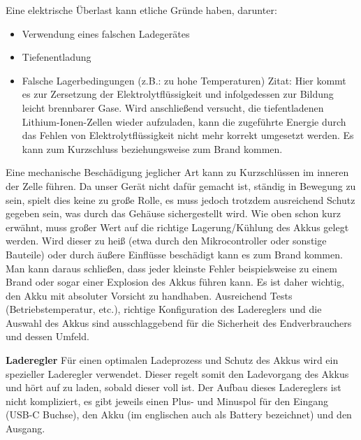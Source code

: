 \documentclass[11pt, twoside]{article}
\begin{document}
Eine elektrische Überlast kann etliche Gründe haben, darunter: 
\begin{itemize}
	\item Verwendung eines falschen Ladegerätes
	\item Tiefenentladung
	\item Falsche Lagerbedingungen (z.B.: zu hohe Temperaturen) 
\newline
Zitat: \glqq Hier kommt es zur Zersetzung der Elektrolytflüssigkeit und infolgedessen zur Bildung leicht brennbarer Gase. Wird anschließend versucht, die tiefentladenen Lithium-Ionen-Zellen wieder aufzuladen, kann die zugeführte Energie durch das Fehlen von Elektrolytflüssigkeit nicht mehr korrekt umgesetzt werden. Es kann zum Kurzschluss beziehungsweise zum Brand kommen.\grqq{} \parencite[][]{noauthor_urlnl11_nodate}
\end{itemize}
Eine mechanische Beschädigung jeglicher Art kann zu Kurzschlüssen im inneren der Zelle führen. Da unser Gerät nicht dafür gemacht ist, ständig in Bewegung zu sein, spielt dies keine zu große Rolle, es muss jedoch trotzdem ausreichend Schutz gegeben sein, was durch das Gehäuse sichergestellt wird.
\vspace{4mm}\newline
Wie oben schon kurz erwähnt, muss großer Wert auf die richtige Lagerung/Kühlung des Akkus gelegt werden. Wird dieser zu heiß (etwa durch den Mikrocontroller oder sonstige Bauteile) oder durch äußere Einflüsse beschädigt kann es zum Brand kommen.
\vspace{4mm}\newline
Man kann daraus schließen, dass jeder kleinste Fehler beispielsweise zu einem Brand oder sogar einer Explosion des Akkus führen kann. Es ist daher wichtig, den Akku mit absoluter Vorsicht zu handhaben. Ausreichend Tests (Betriebstemperatur, etc.), richtige Konfiguration des Ladereglers und die Auswahl des Akkus sind ausschlaggebend für die Sicherheit des Endverbrauchers und dessen Umfeld.

\parencite[vgl.][]{noauthor_urlnl11_nodate}

\textbf{Laderegler}\newline
Für einen optimalen Ladeprozess und Schutz des Akkus wird ein spezieller Laderegler verwendet. Dieser regelt somit den Ladevorgang des Akkus und hört auf zu laden, sobald dieser voll ist. Der Aufbau dieses Ladereglers ist nicht kompliziert, es gibt jeweils einen Plus- und Minuspol für den Eingang (USB-C Buchse), den Akku (im englischen auch als Battery bezeichnet) und den Ausgang.
\end{document}
